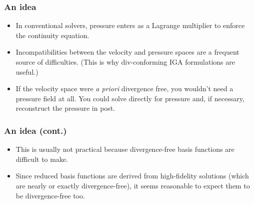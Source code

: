 \documentclass{beamer}
\begin{document}
\begin{frame}
  \frametitle{An idea}

  \begin{itemize}
  \item In conventional solvers, pressure enters as a Lagrange multiplier to enforce the continuity
    equation.
  \item Incompatibilities between the velocity and pressure spaces are a frequent source of
    difficulties. (This is why div-conforming IGA formulations are useful.)
  \item If the velocity space were \emph{a priori} divergence free, you wouldn't need a pressure
    field at all. You could solve directly for pressure and, if necessary, reconstruct the pressure
    in post.
  \end{itemize}
\end{frame}

\begin{frame}
  \frametitle{An idea (cont.)}

  \begin{itemize}
  \item This is usually not practical because divergence-free basis functions are difficult to make.
  \item Since reduced basis functions are derived from high-fidelity solutions (which are nearly or
    exactly divergence-free), it seems reasonable to expect them to be divergence-free too.
  \end{itemize}

  \begin{center}
  \end{center}
\end{frame}
\end{document}
